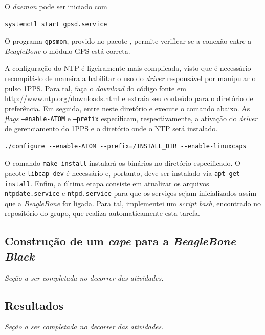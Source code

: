 O \textit{daemon} pode ser iniciado com
 
\begin{lstlisting}[keywordstyle=\ttfamily, style=nonumbers]
systemctl start gpsd.service
\end{lstlisting}

O programa \texttt{gpsmon}, provido no pacote
, permite verificar se a conexão entre a \textit{BeagleBone}
o módulo GPS está correta.

\vspace{12pt}

A configuração do NTP é ligeiramente mais complicada, visto que é necessário
recompilá-lo de maneira a habilitar o uso do \textit{driver} responsável por
manipular o pulso 1PPS. Para tal, faça o \textit{download} do código fonte em
\url{http://www.ntp.org/downloads.html} e extraia seu conteúdo para o diretório
de preferência. Em seguida, entre neste diretório e execute o comando abaixo. As
\textit{flags} \texttt{--enable-ATOM} e \texttt{--prefix} especificam,
respectivamente, a ativação do \textit{driver} de gerenciamento do 1PPS e o
diretório onde o NTP será instalado.

\begin{lstlisting}[keywordstyle=\ttfamily, style=nonumbers]
./configure --enable-ATOM --prefix=/INSTALL_DIR --enable-linuxcaps
\end{lstlisting}

O comando \texttt{make install} instalará os binários no diretório especificado.
O pacote \texttt{libcap-dev} é necessário e, portanto, deve ser instalado via
\texttt{apt-get install}. Enfim, a última etapa consiste em atualizar os
arquivos \texttt{ntpdate.service} e \texttt{ntpd.service} para que os serviços sejam
inicializados assim que a \textit{BeagleBone} for ligada. Para tal, implementei
um \textit{script bash}, encontrado no repositório do grupo, que
realiza automaticamente esta tarefa.

\subsection{Construção de um \textit{cape} para a \textit{BeagleBone Black}}

\textit{Seção a ser completada no decorrer das atividades.}

\subsection{Resultados}

\textit{Seção a ser completada no decorrer das atividades.}